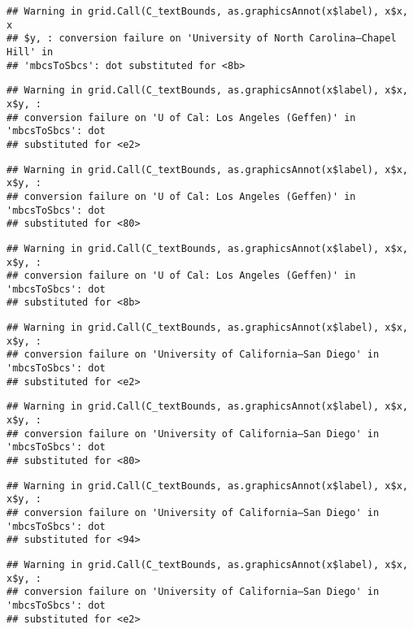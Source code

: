 \documentclass[]{article}
\begin{document}
\begin{verbatim}
## Warning in grid.Call(C_textBounds, as.graphicsAnnot(x$label), x$x, x
## $y, : conversion failure on 'University of North Carolina—​Chapel Hill' in
## 'mbcsToSbcs': dot substituted for <8b>
\end{verbatim}

\begin{verbatim}
## Warning in grid.Call(C_textBounds, as.graphicsAnnot(x$label), x$x, x$y, :
## conversion failure on 'U of Cal: ​Los Angeles (Geffen)' in 'mbcsToSbcs': dot
## substituted for <e2>
\end{verbatim}

\begin{verbatim}
## Warning in grid.Call(C_textBounds, as.graphicsAnnot(x$label), x$x, x$y, :
## conversion failure on 'U of Cal: ​Los Angeles (Geffen)' in 'mbcsToSbcs': dot
## substituted for <80>
\end{verbatim}

\begin{verbatim}
## Warning in grid.Call(C_textBounds, as.graphicsAnnot(x$label), x$x, x$y, :
## conversion failure on 'U of Cal: ​Los Angeles (Geffen)' in 'mbcsToSbcs': dot
## substituted for <8b>
\end{verbatim}

\begin{verbatim}
## Warning in grid.Call(C_textBounds, as.graphicsAnnot(x$label), x$x, x$y, :
## conversion failure on 'University of California—​San Diego' in 'mbcsToSbcs': dot
## substituted for <e2>
\end{verbatim}

\begin{verbatim}
## Warning in grid.Call(C_textBounds, as.graphicsAnnot(x$label), x$x, x$y, :
## conversion failure on 'University of California—​San Diego' in 'mbcsToSbcs': dot
## substituted for <80>
\end{verbatim}

\begin{verbatim}
## Warning in grid.Call(C_textBounds, as.graphicsAnnot(x$label), x$x, x$y, :
## conversion failure on 'University of California—​San Diego' in 'mbcsToSbcs': dot
## substituted for <94>
\end{verbatim}

\begin{verbatim}
## Warning in grid.Call(C_textBounds, as.graphicsAnnot(x$label), x$x, x$y, :
## conversion failure on 'University of California—​San Diego' in 'mbcsToSbcs': dot
## substituted for <e2>
\end{verbatim}
\end{document}
